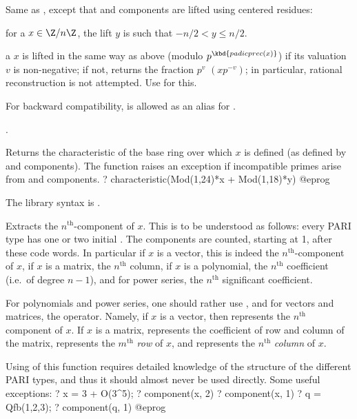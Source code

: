 \label{se:centerlift}
Same as , except that  and  components
are lifted using centered residues:

\item for a  $x\in \Z/n\Z$, the lift $y$ is such that
$-n/2<y\le n/2$.

\item  a  $x$ is lifted in the same way as above (modulo
$p^\kbd{padicprec(x)}$) if its valuation $v$ is non-negative; if not, returns
the fraction $p^v$ $(x p^{-v})$; in particular, rational
reconstruction is not attempted. Use  for this.

For backward compatibility,  is allowed as an alias
for .

.

\label{se:characteristic}
Returns the characteristic of the base ring over which $x$ is defined (as
defined by  and  components). The function raises an
exception if incompatible primes arise from  and 
components.
\bprog
? characteristic(Mod(1,24)*x + Mod(1,18)*y)
@eprog

The library syntax is .

\label{se:component}
Extracts the $n^{\text{th}}$-component of $x$. This is to be understood
as follows: every PARI type has one or two initial . The
components are counted, starting at 1, after these code words. In particular
if $x$ is a vector, this is indeed the $n^{\text{th}}$-component of $x$, if
$x$ is a matrix, the $n^{\text{th}}$ column, if $x$ is a polynomial, the
$n^{\text{th}}$ coefficient (i.e.~of degree $n-1$), and for power series,
the $n^{\text{th}}$ significant coefficient.

For polynomials and power series, one should rather use , and
for vectors and matrices, the \kbd{[$\,$]} operator. Namely, if $x$ is a
vector, then  represents the $n^{\text{th}}$ component of $x$. If
$x$ is a matrix,  represents the coefficient of row  and
column  of the matrix,  represents the $m^{\text{th}}$
\emph{row} of $x$, and  represents the $n^{\text{th}}$
\emph{column} of $x$.

Using of this function requires detailed knowledge of the structure of the
different PARI types, and thus it should almost never be used directly.
Some useful exceptions:
\bprog
    ? x = 3 + O(3^5);
    ? component(x, 2)
    ? component(x, 1)
    ? q = Qfb(1,2,3);
    ? component(q, 1)
@eprog

